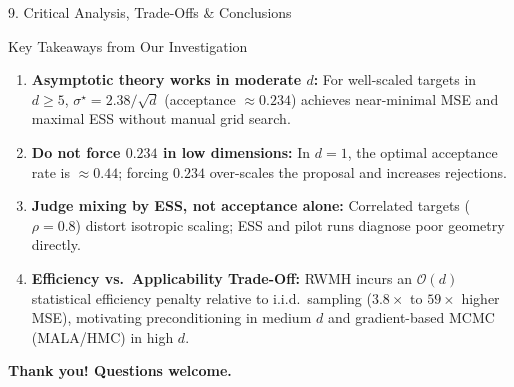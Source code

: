 \documentclass[aspectratio=169, 10pt]{beamer}
\begin{document}
\begin{frame}{9. Critical Analysis, Trade-Offs \& Conclusions}
  \begin{block}{Key Takeaways from Our Investigation}
    \begin{enumerate}
      \item \textbf{Asymptotic theory works in moderate $d$:} For well-scaled targets in $d \ge 5$, $\sigma^\star = 2.38/\sqrt{d}$ (acceptance $\approx 0.234$) achieves near-minimal MSE and maximal ESS without manual grid search.
      \item \textbf{Do not force $0.234$ in low dimensions:} In $d=1$, the optimal acceptance rate is $\approx 0.44$; forcing $0.234$ over-scales the proposal and increases rejections.
      \item \textbf{Judge mixing by ESS, not acceptance alone:} Correlated targets ($\rho=0.8$) distort isotropic scaling; ESS and pilot runs diagnose poor geometry directly.
      \item \textbf{Efficiency vs.\ Applicability Trade-Off:} RWMH incurs an $\mathcal{O}(d)$ statistical efficiency penalty relative to i.i.d.\ sampling ($3.8\times$ to $59\times$ higher MSE), motivating preconditioning in medium $d$ and gradient-based MCMC (MALA/HMC) in high $d$.
    \end{enumerate}
  \end{block}

  \vspace{0.3em}
  \centering
  \textbf{Thank you! Questions welcome.}
\end{frame}
\end{document}
